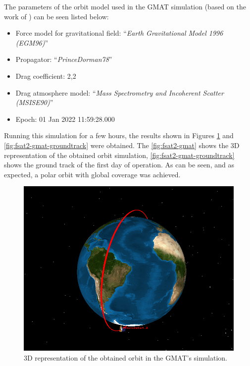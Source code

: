 The parameters of the orbit model used in the GMAT simulation (based on the work of \cite{marino2016}) can be seen listed below:

\begin{itemize}
    \item Force model for gravitational field: ``\textit{Earth Gravitational Model 1996 (EGM96)}'' \cite{lemoine1998}
    \item Propagator: ``\textit{PrinceDorman78}''
    \item Drag coefficient: 2,2
    \item Drag atmosphere model: ``\textit{Mass Spectrometry and Incoherent Scatter (MSISE90)}'' \cite{hedin1991}
    \item Epoch: 01 Jan 2022 11:59:28.000
\end{itemize}


Running this simulation for a few hours, the results shown in Figures \ref{fig:fsat2-gmat} and \ref{fig:fsat2-gmat-groundtrack} were obtained. The \autoref{fig:fsat2-gmat} shows the 3D representation of the obtained orbit simulation, \autoref{fig:fsat2-gmat-groundtrack} shows the ground track of the first day of operation. As can be seen, and as expected, a polar orbit with global coverage was achieved.

\begin{figure}[!ht]
    \begin{center}
        \includegraphics[width=0.6\columnwidth]{figures/fsat2-gmat.png}
        \caption{3D representation of the obtained orbit in the GMAT's simulation.}
        \label{fig:fsat2-gmat}
    \end{center}
\end{figure}

